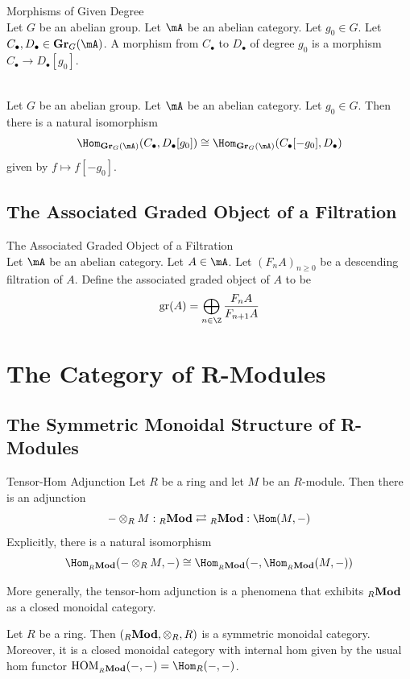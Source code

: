 \documentclass[a4paper]{article}
\begin{document}
\begin{defn}{Morphisms of Given Degree}{}\\
Let $G$ be an abelian group. Let $\mA$ be an abelian category. Let $g_0\in G$. Let $C_\bullet,D_\bullet\in\bold{Gr}_G(\mA)$. A morphism from $C_\bullet$ to $D_\bullet$ of degree $g_0$ is a morphism $C_\bullet\to D_\bullet[g_0]$. 
\end{defn}

\begin{lmm}{}{}\\
Let $G$ be an abelian group. Let $\mA$ be an abelian category. Let $g_0\in G$. Then there is a natural isomorphism $$\Hom_{\bold{Gr}_G(\mA)}(C_\bullet,D_\bullet[g_0])\cong\Hom_{\bold{Gr}_G(\mA)}(C_\bullet[-g_0],D_\bullet)$$ given by $f\mapsto f[-g_0]$. 
\end{lmm}

\subsection{The Associated Graded Object of a Filtration}
\begin{defn}{The Associated Graded Object of a Filtration}{}\\
Let $\mA$ be an abelian category. Let $A\in\mA$. Let $(F_nA)_{n\geq 0}$ be a descending filtration of $A$. Define the associated graded object of $A$ to be $$\text{gr}(A)=\bigoplus_{n\in\Z}\frac{F_nA}{F_{n+1}A}$$
\end{defn}

\pagebreak
\section{The Category of R-Modules}
\subsection{The Symmetric Monoidal Structure of R-Modules}
\begin{thm}{Tensor-Hom Adjunction}{} Let $R$ be a ring and let $M$ be an $R$-module. Then there is an adjunction $$-\otimes_RM:{_R\bold{Mod}}\rightleftarrows{_R\bold{Mod}}:\Hom(M,-)$$ Explicitly, there is a natural isomorphism $$\Hom_{_R\bold{Mod}}(-\otimes_RM,-)\cong\Hom_{_R\bold{Mod}}(-,\Hom_{_R\bold{Mod}}(M,-))$$ 
\end{thm}

More generally, the tensor-hom adjunction is a phenomena that exhibits ${_R}\bold{Mod}$  as a closed monoidal category. 

\begin{prp}{}{} Let $R$ be a ring. Then $({_R}\bold{Mod},\otimes_R,R)$ is a symmetric monoidal category. Moreover, it is a closed monoidal category with internal hom given by the usual hom functor $\text{HOM}_{{_R}\bold{Mod}}(-,-)=\Hom_R(-,-)$. 
\end{prp}
\end{document}
